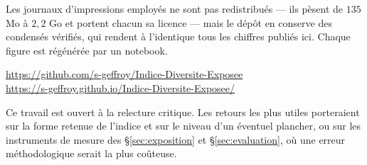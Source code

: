 \documentclass[11pt,a4paper]{article}
\begin{document}
Les journaux d'impressions employés ne sont pas redistribués --- ils pèsent de $135$ Mo à
$2{,}2$ Go et portent chacun sa licence --- mais le dépôt en conserve des condensés vérifiés,
qui rendent à l'identique tous les chiffres publiés ici. Chaque figure est régénérée par un
notebook.

\begin{center}
\url{https://github.com/s-geffroy/Indice-Diversite-Exposee}\\
\url{https://s-geffroy.github.io/Indice-Diversite-Exposee/}
\end{center}

Ce travail est ouvert à la relecture critique. Les retours les plus utiles porteraient sur la
forme retenue de l'indice et sur le niveau d'un éventuel plancher, ou sur les instruments de
mesure des \S\ref{sec:exposition} et \S\ref{sec:evaluation}, où une erreur méthodologique
serait la plus coûteuse.


\end{document}
